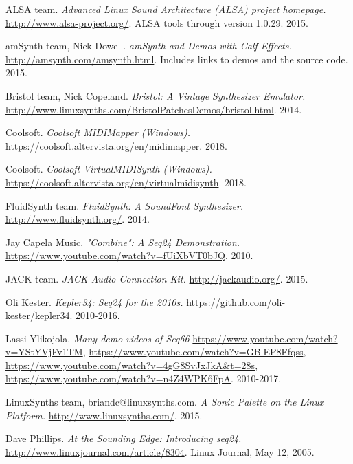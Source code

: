 \begin{thebibliography}{99}

   ALSA team.
   \emph{Advanced Linux Sound Architecture (ALSA) project homepage.}
   \url{http://www.alsa-project.org/}.
   ALSA tools through version 1.0.29.
   2015.

   amSynth team, Nick Dowell.
   \emph{amSynth and Demos with Calf Effects.}
   \url{http://amsynth.com/amsynth.html}.
   Includes links to demos and the source code.
   2015.

   Bristol team, Nick Copeland.
   \emph{Bristol: A Vintage Synthesizer Emulator.}
   \url{http://www.linuxsynths.com/BristolPatchesDemos/bristol.html}.
   2014.

   Coolsoft.
   \emph{Coolsoft MIDIMapper (Windows).}
   \url{https://coolsoft.altervista.org/en/midimapper}.
   2018.

   Coolsoft.
   \emph{Coolsoft VirtualMIDISynth (Windows).}
   \url{https://coolsoft.altervista.org/en/virtualmidisynth}.
   2018.

   FluidSynth team.
   \emph{FluidSynth: A SoundFont Synthesizer.}
   \url{http://www.fluidsynth.org/}.
   2014.

   Jay Capela Music.
   \emph{"Combine": A Seq24 Demonstration.}
   \url{https://www.youtube.com/watch?v=fUiXbVT0bJQ}.
   2010.

   JACK team.
   \emph{JACK Audio Connection Kit.}
   \url{http://jackaudio.org/}.
   2015.

   Oli Kester.
   \emph{Kepler34: Seq24 for the 2010s.}
   \url{https://github.com/oli-kester/kepler34}.
   2010-2016.

   Lassi Ylikojola.
   \emph{Many demo videos of Seq66}
   \url{https://www.youtube.com/watch?v=YStYVjFv1TM},
   \url{https://www.youtube.com/watch?v=GBlEP8Ffqss},
   \url{https://www.youtube.com/watch?v=4gG8SvJxJkA&t=28s},
   \url{https://www.youtube.com/watch?v=n4Z4WPK6FpA}.
   2010-2017.

   LinuxSynths team, briandc@linuxsynths.com.
   \emph{A Sonic Palette on the Linux Platform.}
   \url{http://www.linuxsynths.com/}.
   2015.

   Dave Phillips.
   \emph{At the Sounding Edge: Introducing seq24.}
   \url{http://www.linuxjournal.com/article/8304}.
   Linux Journal, May 12, 2005.


\end{thebibliography}
